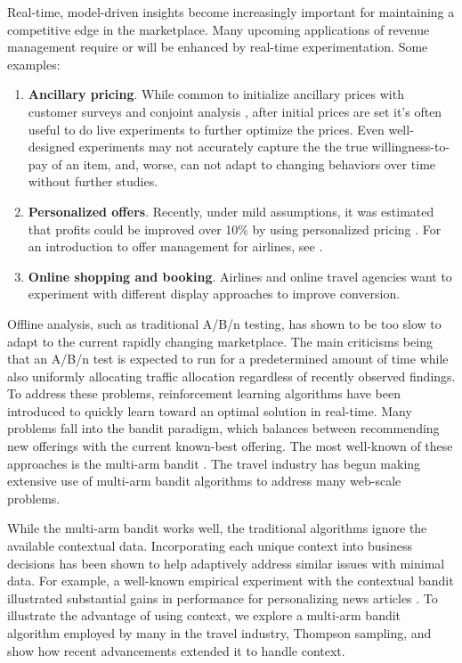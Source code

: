 \documentclass[12pt]{article}
\begin{document}
Real-time, model-driven insights become increasingly important for maintaining a
competitive edge in the marketplace.
Many upcoming applications of revenue management require or will be enhanced by 
real-time experimentation. 
Some examples:
\begin{enumerate}
\item \textbf{Ancillary pricing}. 
While common to initialize ancillary prices with customer surveys and conjoint 
analysis \cite{green2001thirty}, after initial prices are set it's often useful 
to do live experiments to further optimize the prices. 
Even well-designed experiments may not accurately capture the the true 
willingness-to-pay of an item, and, worse, can not adapt to changing behaviors 
over time without further studies. 
\item \textbf{Personalized offers}.  
Recently, under mild assumptions, it was estimated that profits could be improved 
over 10\% by using personalized pricing \cite{dube2019personalized}.  
For an introduction to offer management for airlines, see 
\cite{vinod2018approach}.
\item \textbf{Online shopping and booking}. 
Airlines and online travel agencies want to experiment with different display 
approaches to improve conversion. 
\end{enumerate}
 
Offline analysis, such as traditional A/B/n testing, has shown to be too slow to 
adapt to the current rapidly changing marketplace.
The main criticisms being that an A/B/n test is expected to run for a 
predetermined amount of time while also uniformly allocating traffic allocation
regardless of recently observed findings.
To address these problems, reinforcement learning algorithms have been introduced
to quickly learn toward an optimal solution in real-time. 
Many problems fall into the bandit paradigm, which balances between recommending
new offerings with the current known-best offering.
The most well-known of these approaches is the multi-arm bandit 
\cite{whittle1980multi}.
The travel industry has begun making extensive use of multi-arm bandit algorithms
to address many web-scale problems.

While the multi-arm bandit works well, the traditional algorithms ignore the
available contextual data.  
Incorporating each unique context into business decisions has been shown to help
adaptively address similar issues with minimal data.
For example, a well-known empirical experiment with the contextual bandit 
illustrated substantial gains in performance for personalizing news articles
\cite{li2010contextual}.
To illustrate the advantage of using context, we explore a multi-arm bandit 
algorithm employed by many in the travel industry, Thompson sampling, and
show how recent advancements extended it to handle context.
\end{document}
